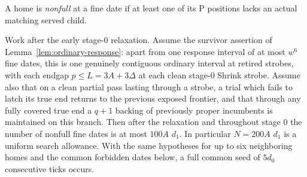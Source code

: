 A home is \emph{nonfull} at a fine date if at least one of its P positions lacks an actual matching served child.
\begin{lemma}\label{lem:seed}
Work after the early stage-0 relaxation. Assume the survivor assertion of Lemma~\ref{lem:ordinary-response}: apart from one response interval of at most \(w^6\) fine dates, this is one genuinely contiguous ordinary interval at retired strobes, with each endgap \(p\le L=3A+3\Delta \) at each clean stage-0 Shrink strobe. Assume also that on a clean partial pass lasting through a strobe, a trial which fails to latch its true end returns to the previous exposed frontier, and that through any fully covered true end a \(q+1\) backing of previously proper incumbents is maintained on this branch. Then after the relaxation and throughout stage 0 the number of nonfull fine dates is at most \(100A\) \(d_1\). In particular \(N=200A\) \(d_1\) is a uniform search allowance. With the same hypotheses for up to six neighboring homes and the common forbidden dates below, a full common seed of \(5d_0\) consecutive ticks occurs.
\end{lemma}
